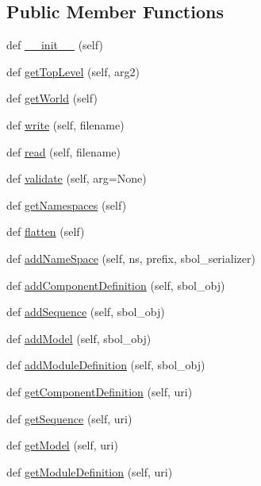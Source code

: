 \subsection*{Public Member Functions}
\begin{DoxyCompactItemize}
\item 
def \hyperlink{classsbol_1_1libsbol_1_1_document_a63f1fb683227a5f859b4d69c7c112719}{\+\_\+\+\_\+init\+\_\+\+\_\+} (self)
\item 
def \hyperlink{classsbol_1_1libsbol_1_1_document_a7bd75a016d50faabda1a2938a251057f}{get\+Top\+Level} (self, arg2)
\item 
def \hyperlink{classsbol_1_1libsbol_1_1_document_ae578f35d06b76fbb16f671a57122458f}{get\+World} (self)
\item 
def \hyperlink{classsbol_1_1libsbol_1_1_document_a12ad5b7793e9b00a6b776243d1d41c9b}{write} (self, filename)
\item 
def \hyperlink{classsbol_1_1libsbol_1_1_document_aadadbc4e12950cf39ad9abe56f409a01}{read} (self, filename)
\item 
def \hyperlink{classsbol_1_1libsbol_1_1_document_a5dfbca7fef350e3cef714ead3526fdd0}{validate} (self, arg=None)
\item 
def \hyperlink{classsbol_1_1libsbol_1_1_document_a7b0b010ddc545af5edcc52b505d281e8}{get\+Namespaces} (self)
\item 
def \hyperlink{classsbol_1_1libsbol_1_1_document_ae935e1457a5ac794395cecc0103d99fe}{flatten} (self)
\item 
def \hyperlink{classsbol_1_1libsbol_1_1_document_a24148c68a307bd9ed21732b51d7c899c}{add\+Name\+Space} (self, ns, prefix, sbol\+\_\+serializer)
\item 
def \hyperlink{classsbol_1_1libsbol_1_1_document_ae73b90e12d8a22cb4cdef92cf35d9b05}{add\+Component\+Definition} (self, sbol\+\_\+obj)
\item 
def \hyperlink{classsbol_1_1libsbol_1_1_document_a954d9da279c66f9f7208830741ec6f4c}{add\+Sequence} (self, sbol\+\_\+obj)
\item 
def \hyperlink{classsbol_1_1libsbol_1_1_document_ac694a09cc8d745b22f5a8d45ec45e4da}{add\+Model} (self, sbol\+\_\+obj)
\item 
def \hyperlink{classsbol_1_1libsbol_1_1_document_ac1d0d65f573a4ecbacb46d7fd308bfc4}{add\+Module\+Definition} (self, sbol\+\_\+obj)
\item 
def \hyperlink{classsbol_1_1libsbol_1_1_document_a44975d2d2bf308b45b158c14457c9ce2}{get\+Component\+Definition} (self, uri)
\item 
def \hyperlink{classsbol_1_1libsbol_1_1_document_a182f90d0a332c53de4c7696f227a3886}{get\+Sequence} (self, uri)
\item 
def \hyperlink{classsbol_1_1libsbol_1_1_document_af725468fba9d83349617e64513f3d4b4}{get\+Model} (self, uri)
\item 
def \hyperlink{classsbol_1_1libsbol_1_1_document_a4858984056f54cf78830b55c510287ca}{get\+Module\+Definition} (self, uri)
\end{DoxyCompactItemize}
